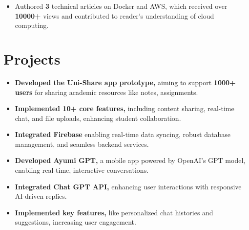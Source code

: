 \documentclass[]{deedy-resume-openfont}
\begin{document}
\begin{minipage}[t]{0.66\textwidth}
\vspace{\topsep}
\begin{itemize}[leftmargin=*]
    \item Authored \textbf{3} technical articles on Docker and AWS, which received over \textbf{10000+} views and contributed to reader's understanding of cloud computing.
\end{itemize}

\sectionsep

\vspace{-2.2mm}
\section{Projects}
\begin{itemize}[leftmargin=*]
    \item \textbf{Developed the Uni-Share app prototype,} aiming to support \textbf {1000+ users} for sharing academic resources like notes, assignments.
    \vspace{-2.3mm} %
    \item \textbf{Implemented 10+ core features,} including content sharing, real-time chat, and file uploads, enhancing student collaboration.
    \vspace{-2.3mm}
    \item \textbf{Integrated Firebase} enabling real-time data syncing, robust database management, and seamless backend services.
\end{itemize}
\sectionsep

\begin{itemize}[leftmargin=*]
    \item \textbf{Developed Ayumi GPT,} a mobile app powered by OpenAI’s GPT model, enabling real-time, interactive conversations.
    \vspace{-2.4mm} %
    \item \textbf{Integrated Chat GPT API,} enhancing user interactions with responsive AI-driven replies.
    \vspace{-2.4mm}
    \item \textbf{Implemented key features,} like personalized chat histories and suggestions, increasing user engagement.
\end{itemize}
\sectionsep

\end{minipage} 
\end{document}

